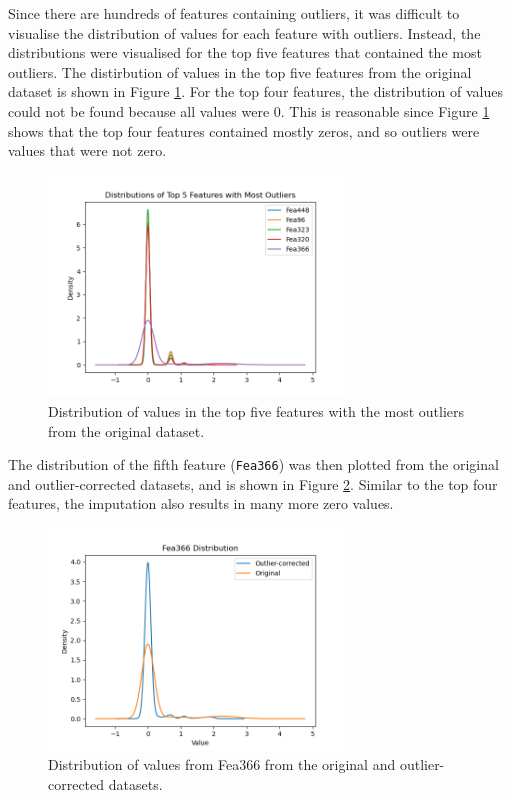 \documentclass{article}
\begin{document}
\begin{enumerate}[label=\alph*)]
    Since there are hundreds of features containing outliers, it was difficult to visualise the distribution of values for each feature with outliers. Instead, the distributions were visualised for the top five features that contained the most outliers. The distirbution of values in the top five features from the original dataset is shown in Figure \ref{fig:Q3e_outliers_original}. For the top four features, the distribution of values could not be found because all values were 0. This is reasonable since Figure \ref{fig:Q3e_outliers_original} shows that the top four features contained mostly zeros, and so outliers were values that were not zero.
    \begin{figure}[!htb]
        \centering
        \includegraphics[width=0.7\textwidth]{Q3e_top5_outliers_original.png}
        \caption{Distribution of values in the top five features with the most outliers from the original dataset.}
        \label{fig:Q3e_outliers_original}
    \end{figure}
    The distribution of the fifth feature (\verb|Fea366|) was then plotted from the original and outlier-corrected datasets, and is shown in Figure \ref{fig:Q3e_outliers_corrected}. Similar to the top four features, the imputation also results in many more zero values.
    \begin{figure}[!htb]
        \centering
        \includegraphics[width=0.7\textwidth]{Q3e_Fea366_dist.png}
        \caption{Distribution of values from Fea366 from the original and outlier-corrected datasets.}
        \label{fig:Q3e_outliers_corrected}
    \end{figure}
\end{enumerate}
\end{document}
